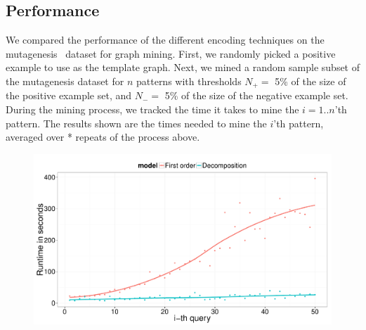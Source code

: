 %
%
%
%
%
%
%
%

\subsection{Performance}
We compared the performance of the different encoding techniques on the mutagenesis~\citep{?} dataset for graph mining.
First, we randomly picked a positive example to use as the template graph.
Next, we mined a random sample subset of the mutagenesis dataset for $n$ patterns with thresholds $N_{+} = $ 5\% of the size of the positive example set, and $N_{-} =$ 5\% of the size of the negative example set.
During the mining process, we tracked the time it takes to mine the $i=1..n$'th pattern.
The results shown are the times needed to mine the $i$'th pattern, averaged over * repeats of the process above.
\begin{figure}
\includegraphics[width=\linewidth]{extra/figure_comparison_yoshida.pdf}
\end{figure}
